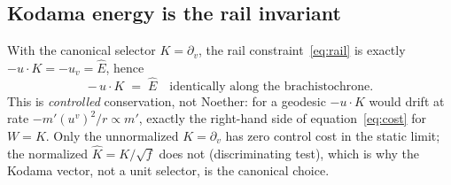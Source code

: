 \documentclass[12pt]{iopart}
\newcommand{\Ehat}{\hat E}
\theoremstyle{plain}
\theoremstyle{definition}
\theoremstyle{plain}
\theoremstyle{remark}
\begin{document}
\subsection{Kodama energy is the rail invariant}
\label{sec:kodama-energy}
With the canonical selector $K=\partial_v$, the rail constraint~\eqref{eq:rail} is
exactly $-u\cdot K=-u_v=\Ehat$, hence
\begin{equation}
    -\,u\cdot K \;=\; \Ehat \quad\text{identically along the brachistochrone.}
    \label{eq:kodama-conserved}
\end{equation}
This is \emph{controlled} conservation, not Noether: for a geodesic
$-u\cdot K$ would drift at rate $-m'(u^v)^2/r\propto m'$, exactly the
right-hand side of equation~\eqref{eq:cost} for $W=K$. Only the unnormalized
$K=\partial_v$ has zero control cost in the static limit; the normalized
$\hat K=K/\sqrt f$ does not (discriminating test), which is why the Kodama
vector, not a unit selector, is the canonical choice.
\end{document}
